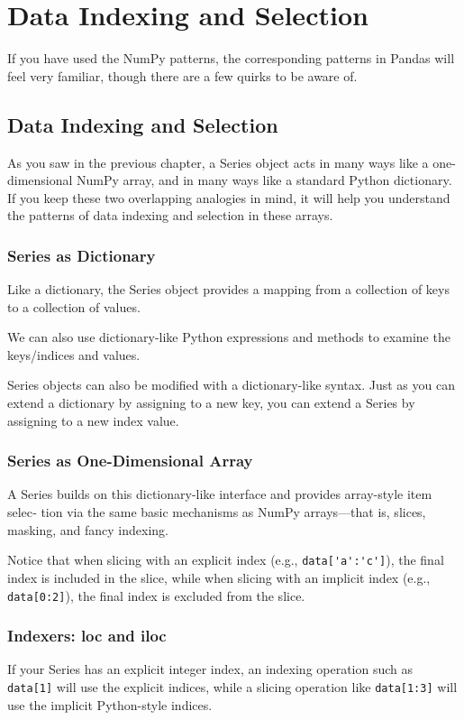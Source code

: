 \chapter{Data Indexing and Selection\label{Ch14}}
If you have
used the NumPy patterns, the corresponding patterns in Pandas will feel very familiar, though there are a few quirks to be aware of.
\section{Data Indexing and Selection}
As you saw in the previous chapter, a Series object acts in many ways like a one-
dimensional NumPy array, and in many ways like a standard Python dictionary. If
you keep these two overlapping analogies in mind, it will help you understand the
patterns of data indexing and selection in these arrays.
\subsection*{Series as Dictionary}
Like a dictionary, the Series object provides a mapping from a collection of keys to a
collection of values.

We can also use dictionary-like Python expressions and methods to examine the
keys/indices and values.

Series objects can also be modified with a dictionary-like syntax. Just as you can
extend a dictionary by assigning to a new key, you can extend a Series by assigning
to a new index value.

\subsection*{Series as One-Dimensional Array}
A Series builds on this dictionary-like interface and provides array-style item selec‐
tion via the same basic mechanisms as NumPy arrays—that is, slices, masking, and
fancy indexing.

\begin{tcolorbox}
    Notice that when slicing
    with an explicit index (e.g., \verb|data['a':'c']|), the final index is included in the slice,
    while when slicing with an implicit index (e.g., \verb|data[0:2]|), the final index is excluded
    from the slice.
\end{tcolorbox}

\subsection*{Indexers: loc and iloc}
If your Series has an explicit integer index, an indexing operation such as \verb|data[1]|
will use the explicit indices, while a slicing operation like \verb|data[1:3]| will use the
implicit Python-style indices.

